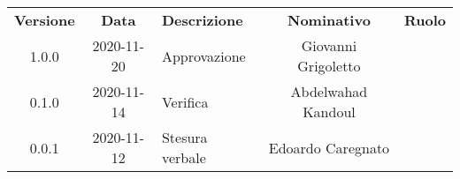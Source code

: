 {
    \renewcommand{\arraystretch}{1.5}
    \centering
    \begin{longtable}{ c c  C{4cm}  c  c }
        \rowcolor{\primaryColor}
        \textcolor{\secondaryColor}{
        \textbf{Versione}}     & \textcolor{\secondaryColor}{\textbf{Data}}       & \textcolor{\secondaryColor}
        {\textbf{Descrizione}} & \textcolor{\secondaryColor}{\textbf{Nominativo}} & \textcolor{\secondaryColor}{\textbf{Ruolo}}                          \\


        1.0.0                  & 2020-11-20                                       & Approvazione                                & Giovanni Grigoletto & \responsabile{} \\
        0.1.0                  & 2020-11-14                                       & Verifica                                    & Abdelwahad Kandoul & \verificatore{} \\
        0.0.1                  & 2020-11-12                                      & Stesura verbale                           &  Edoardo Caregnato & \redattore{}    \\
    \end{longtable}
}